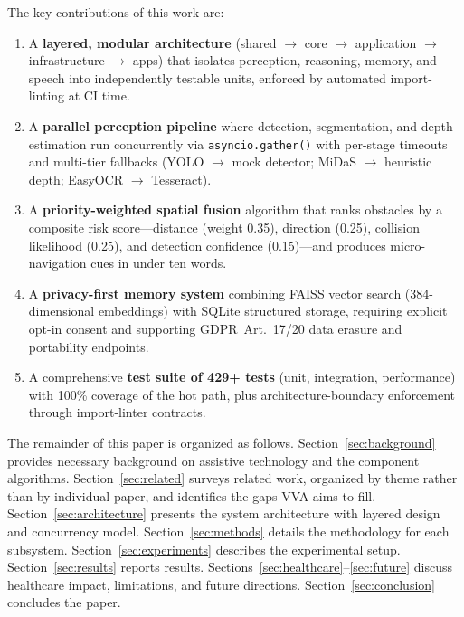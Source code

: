 \medskip
\noindent The key contributions of this work are:
\begin{enumerate}
    \item A \textbf{layered, modular architecture} (shared $\to$ core $\to$ application $\to$ infrastructure $\to$ apps) that isolates perception, reasoning, memory, and speech into independently testable units, enforced by automated import-linting at CI time.
    \item A \textbf{parallel perception pipeline} where detection, segmentation, and depth estimation run concurrently via \texttt{asyncio.gather()} with per-stage timeouts and multi-tier fallbacks (YOLO $\to$ mock detector; MiDaS $\to$ heuristic depth; EasyOCR $\to$ Tesseract).
    \item A \textbf{priority-weighted spatial fusion} algorithm that ranks obstacles by a composite risk score---distance (weight 0.35), direction (0.25), collision likelihood (0.25), and detection confidence (0.15)---and produces micro-navigation cues in under ten words.
    \item A \textbf{privacy-first memory system} combining FAISS vector search (384-dimensional embeddings) with SQLite structured storage, requiring explicit opt-in consent and supporting GDPR~Art.~17/20 data erasure and portability endpoints.
    \item A comprehensive \textbf{test suite of 429+ tests} (unit, integration, performance) with 100\% coverage of the hot path, plus architecture-boundary enforcement through import-linter contracts.
\end{enumerate}

The remainder of this paper is organized as follows. Section~\ref{sec:background} provides necessary background on assistive technology and the component algorithms. Section~\ref{sec:related} surveys related work, organized by theme rather than by individual paper, and identifies the gaps VVA aims to fill. Section~\ref{sec:architecture} presents the system architecture with layered design and concurrency model. Section~\ref{sec:methods} details the methodology for each subsystem. Section~\ref{sec:experiments} describes the experimental setup. Section~\ref{sec:results} reports results. Sections~\ref{sec:healthcare}--\ref{sec:future} discuss healthcare impact, limitations, and future directions. Section~\ref{sec:conclusion} concludes the paper.
